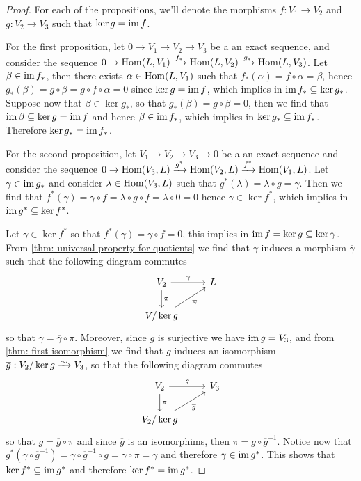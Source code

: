 \begin{proof}
  For each of the propositions, we'll denote the morphisms \(f: V_1 \to V_2\)
  and  \(g: V_2 \to V_3\) such that \(\ker g = \operatorname{im} f\).

  For the first proposition, let \(0 \to V_1 \to V_2 \to V_3\) be a an exact
  sequence, and consider the sequence \(0 \to \operatorname{Hom}(L, V_1) \xrightarrow{f_*}
  \operatorname{Hom}(L, V_2) \xrightarrow{g_*} \operatorname{Hom}(L, V_3)\). Let \(\beta \in \operatorname{im} f_*\), then
  there exists \(\alpha \in \operatorname{Hom}(L, V_1)\) such that \(f_*(\alpha) = f \circ
  \alpha = \beta\), hence \(g_*(\beta) = g \circ \beta = g \circ f \circ \alpha
  = 0\) since \(\ker g = \operatorname{im} f\), which implies in \(\operatorname{im} f_* \subseteq \ker
  g_*\).  Suppose now that \(\beta \in \ker g_*\), so that \(g_*(\beta) = g
  \circ \beta = 0\), then we find that \(\operatorname{im} \beta \subseteq \ker g = \operatorname{im} f\)
  and hence \(\beta \in \operatorname{im} f_*\), which implies in \(\ker g_* \subseteq \operatorname{im}
  f_*\).  Therefore \(\ker g_* = \operatorname{im} f_*\).

  For the second proposition, let \(V_1 \to V_2 \to V_3 \to 0\) be a an exact
  sequence and consider the sequence \(0 \to \operatorname{Hom}(V_3, L) \xrightarrow{g^*}
  \operatorname{Hom}(V_2, L) \xrightarrow{f^*} \operatorname{Hom}(V_1, L)\). Let \(\gamma \in \operatorname{im} g_*\) and
  consider \(\lambda \in \operatorname{Hom}(V_3, L)\) such that \(g^*(\lambda) = \lambda \circ
  g = \gamma\). Then we find that \(f^*(\gamma) = \gamma \circ f = \lambda \circ
  g \circ f = \lambda \circ 0 = 0\) hence \(\gamma \in \ker f^*\), which implies
  in \(\operatorname{im} g^* \subseteq \ker f^*\).

  Let \(\gamma \in \ker f^*\) so that \(f^*(\gamma) = \gamma \circ f = 0\), this
  implies in \(\operatorname{im} f = \ker g \subseteq \ker \gamma\). From \cref{thm: universal
  property for quotients} we find that \(\gamma\) induces a morphism
  \(\overline\gamma\) such that the following diagram commutes
  \[
    \begin{tikzcd}
      V_2 \ar[r, "\gamma"] \ar[d, "\pi"] &L \\
      V/\ker g \ar[ur, swap, "\overline\gamma"]
    \end{tikzcd}
  \] 
  so that \(\gamma = \overline\gamma \circ \pi\). Moreover, since \(g\) is
  surjective we have \(\operatorname{im} g = V_3\), and from \cref{thm: first isomorphism} we
  find that \(g\) induces an isomorphism \(\overline g: V_2/\ker g \isoto
  V_3\), so that the following diagram commutes
  \[
    \begin{tikzcd} 
      V_2 \ar[r, "g"] \ar[d, "\pi"] &V_3 \\
      V_2/\ker g \ar[ru, swap, "\overline g"]
    \end{tikzcd}
  \] 
  so that \(g = \overline g \circ \pi\) and since \(\overline g\) is an
  isomorphims, then \(\pi = g \circ \overline g^{-1}\). Notice now that
  \(g^*(\overline \gamma \circ \overline g^{-1}) = \overline\gamma \circ
  \overline g^{-1} \circ g = \overline\gamma \circ \pi = \gamma\) and therefore
  \(\gamma \in \operatorname{im} g^*\). This shows that \(\ker f^* \subseteq \operatorname{im} g^*\) and
  therefore \(\ker f^* = \operatorname{im} g^*\).
\end{proof}
